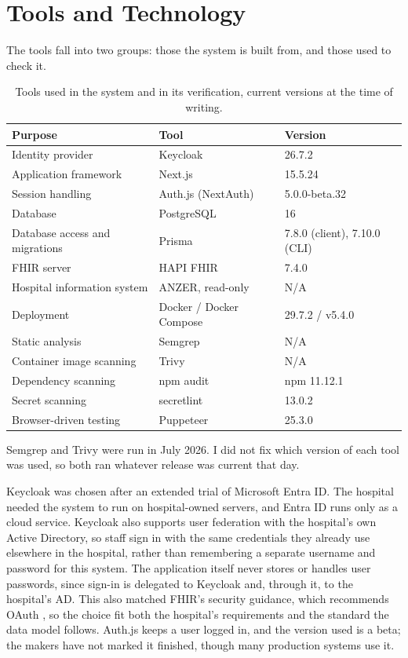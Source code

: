 \section{Tools and Technology}
\label{sec:met-tools}

The tools fall into two groups: those the system is built from, and those used to check it.

\begin{table}[H]
\centering
\caption{Tools used in the system and in its verification, current versions at the time of writing.}
\label{tab:tools}
\begin{tabular}{|p{6cm}|p{4.5cm}|p{3.4cm}|}
\hline
\textbf{Purpose} & \textbf{Tool} & \textbf{Version} \\
\hline
Identity provider & Keycloak & 26.7.2 \\
\hline
Application framework & Next.js & 15.5.24 \\
\hline
Session handling & Auth.js (NextAuth) & 5.0.0-beta.32 \\
\hline
Database & PostgreSQL & 16 \\
\hline
Database access and migrations & Prisma & 7.8.0 (client), 7.10.0 (CLI) \\
\hline
FHIR server & HAPI FHIR & 7.4.0 \\
\hline
Hospital information system & ANZER, read-only & N/A \\
\hline
Deployment & Docker / Docker Compose & 29.7.2 / v5.4.0 \\
\hline
Static analysis & Semgrep & N/A \\
\hline
Container image scanning & Trivy & N/A \\
\hline
Dependency scanning & npm audit & npm 11.12.1 \\
\hline
Secret scanning & secretlint & 13.0.2 \\
\hline
Browser-driven testing & Puppeteer & 25.3.0 \\
\hline
\end{tabular}
\end{table}

Semgrep and Trivy were run in July 2026. I did not fix which version of each tool was used, so both ran whatever release was current that day.

Keycloak was chosen after an extended trial of Microsoft Entra ID. The hospital needed the system to run on hospital-owned servers, and Entra ID runs only as a cloud service. Keycloak also supports user federation with the hospital's own Active Directory, so staff sign in with the same credentials they already use elsewhere in the hospital, rather than remembering a separate username and password for this system. The application itself never stores or handles user passwords, since sign-in is delegated to Keycloak and, through it, to the hospital's AD. This also matched FHIR's security guidance, which recommends OAuth \cite{hl7fhir}, so the choice fit both the hospital's requirements and the standard the data model follows. Auth.js keeps a user logged in, and the version used is a beta; the makers have not marked it finished, though many production systems use it.

